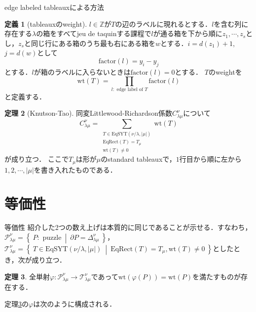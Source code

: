 \documentclass[unicode,12pt]{beamer}%
\theoremstyle{definition}
\newtheorem{defin}{定義}[section]
\newtheorem{theo}[defin]{定理}
\theoremstyle{example}
\newcommand{\integer}{\mathbb{Z}}
\newcommand{\set}[2]{\left\{\:#1\:\middle|\:#2\:\right\}}
\begin{document}
\begin{frame}{edge labeled tableauxによる方法}
  \begin{defin}[tableauxのweight]
    \small
    $l\in\integer$が$T$の辺のラベルに現れるとする．$l$を含む列に存在する$\lambda$の箱をすべてjeu de taquinする課程で$l$が通る箱を下から順に$z_{1},\cdots,z_{s}$とし，$z_{s}$と同じ行にある箱のうち最も右にある箱を$w$とする．$i = d(z_1) + 1$, $j = d(w)$として
    \[
    \text{factor}(l) = y_i - y_j
    \]
    とする．$l$が箱のラベルに入らないときは$\text{factor}(l) = 0$とする．
    $T$のweightを
    \[
    \text{wt}(T) = \prod_{l:\text{ edge label of }T} \text{factor}(l)
    \]
    と定義する．
  \end{defin}
  \normalsize
\end{frame}

\begin{frame}
  \begin{theo}[Knutson-Tao]
    同変Littlewood-Richardson係数$C^\nu_{\lambda\mu}$について
    \[
    C^\nu_{\lambda\mu} = \sum_{\substack{
      T\in\text{EqSYT}(\nu/\lambda,|\mu|)\\
      \text{EqRect}(T) = T_\mu\\
      \text{wt}(T)\neq 0
    }}\text{wt}(T)
    \]
    が成り立つ．
    ここで$T_\mu$は形が$\mu$のstandard tableauxで，$1$行目から順に左から$1,2,\cdots,|\mu|$を書き入れたものである．
  \end{theo}
\end{frame}


\section{等価性}

\begin{frame}{等価性}
  紹介した2つの数え上げは本質的に同じであることが示せる．すなわち，
  $\mathcal{P}^\nu_{\lambda\mu}=\set{P:\text{ puzzle}}{\partial P = \Delta^\nu_{\lambda\mu}}$，$\mathcal{T}^\nu_{\lambda\mu} = \set{T\in\text{EqSYT}(\nu/\lambda,|\mu|)}{\text{EqRect}(T)=T_\mu,\text{wt}(T)\neq 0}$としたとき，次が成り立つ．
  \begin{theo}\label{main theorem}
    全単射$\varphi:\mathcal{P}^\nu_{\lambda\mu}\rightarrow \mathcal{T}^\nu_{\lambda\mu}$であって$\text{wt}(\varphi(P))=\text{wt}(P)$を満たすものが存在する．
  \end{theo}
\end{frame}

\begin{frame}
  定理\ref{main theorem}の$\varphi$は次のように構成される．
\end{frame}
\end{document}
